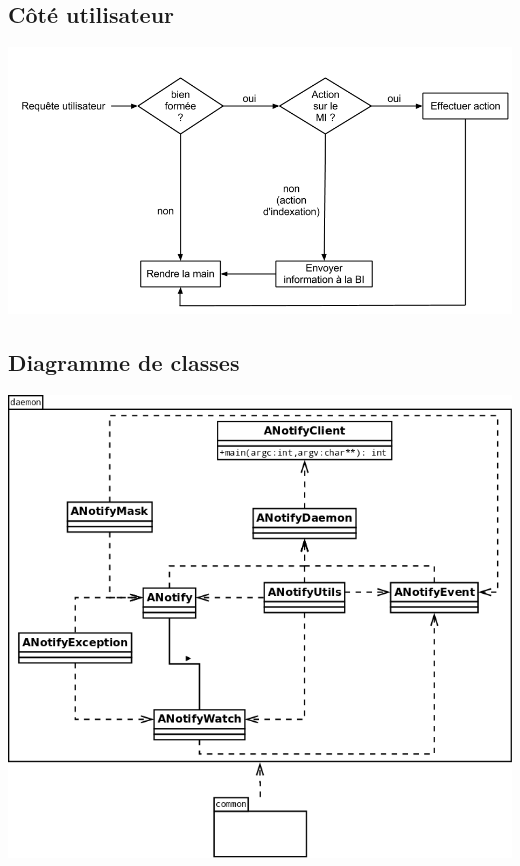 \newpage
\subsection{Côté utilisateur}\label{decision-mi}
\begin{center}
\includegraphics[scale=0.45]{"images/decision_util_mi"}
\end{center}

\newpage

\subsection{Diagramme de classes}\label{diagramme_classes_mi}
\begin{center}
\includegraphics[scale=0.4]{"images/diagramme_classes_mi"}
\end{center}


